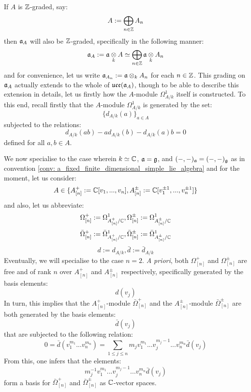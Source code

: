\begin{remark}
                If $A$ is $\mathbb{Z}$-graded, say:
                    $$A := \bigoplus_{n \in \mathbb{Z}} A_n$$
                then $\mathfrak{a}_A$ will also be $\mathbb{Z}$-graded, specifically in the following manner:
                    $$\a_A := \a \tensor_k A \cong \bigoplus_{n \in \Z} \a \tensor_k A_n$$
                and for convenience, let us write $\a_{A_n} := \a \tensor_k A_n$ for each $n \in \mathbb{Z}$. This grading on $\mathfrak{a}_A$ actually extends to the whole of $\mathfrak{uce}(\mathfrak{a}_A)$, though to be able to describe this extension in details, let us firstly how the $A$-module $\Omega^1_{A/k}$ itself is constructed. To this end, recall firstly that the $A$-module $\Omega^1_{A/k}$ is generated by the set:
                    $$\{d_{A/k}(a)\}_{a \in A}$$
                subjected to the relations:
                    $$d_{A/k}(ab) - a d_{A/k}(b) - d_{A/k}(a) b = 0$$
                defined for all $a, b \in A$. 

                We now specialise to the case wherein $k \simeq \mathbb{C}$, $\mathfrak{a} = \mathfrak{g}$, and $(-, -)_{\mathfrak{a}} = (-, -)_{\mathfrak{g}}$ as in convention \ref{conv: a_fixed_finite_dimensional_simple_lie_algebra} and for the moment, let us consider:
                    $$A \in \{ A_{[n]}^+ := \mathbb{C}[v_1, ..., v_n], A_{[n]}^{\pm} := \mathbb{C}[v_1^{\pm 1}, ..., v_n^{\pm 1}] \}$$
                and also, let us abbreviate:
                    $$\Omega^+_{[n]} := \Omega^1_{A_{[n]}^+/\mathbb{C}}, \Omega^{\pm}_{[n]} := \Omega^1_{A_{[n]}^{\pm}/\mathbb{C}}$$
                    $$\bar{\Omega}^+_{[n]} := \bar{\Omega}^1_{A_{[n]}^+/\mathbb{C}}, \bar{\Omega}_{[n]}^{\pm} := \bar{\Omega}^1_{A_{[n]}^{\pm}/\mathbb{C}}$$
                    $$d := d_{A/k}, \bar{d} := \bar{d}_{A/k}$$
                Eventually, we will specialise to the case $n = 2$. \textit{A priori}, both $\Omega^+_{[n]}$ and $\Omega^{\pm}_{[n]}$ are free and of rank $n$ over $A_{[n]}^+$ and $A_{[n]}^{\pm}$ respectively, specifically generated by the basis elements:
                    $$d(v_j)$$
                In turn, this implies that the $A_{[n]}^+$-module $\bar{\Omega}^+_{[n]}$ and the $A_{[n]}^{\pm}$-module $\bar{\Omega}_{[n]}^{\pm}$ are both generated by the basis elements:
                    $$\bar{d}(v_j)$$
                that are subjected to the following relation:
                    $$0 = \bar{d}( v_1^{m_1} ... v_n^{m_n} ) = \sum_{1 \leq j \leq n} m_j v_1^{m_1} ... v_j^{m_j - 1} ... v_n^{m_n} \bar{d}(v_j)$$
                From this, one infers that the elements:
                    $$m_j^{-1} v_1^{m_1} ... v_j^{m_j - 1} ... v_n^{m_n} \bar{d}(v_j)$$
                form a basis for $\bar{\Omega}^+_{[n]}$ and $\bar{\Omega}_{[n]}^{\pm}$ as $\mathbb{C}$-vector spaces. 


\end{remark}
